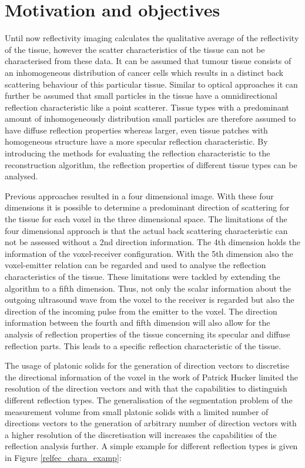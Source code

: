 \section{Motivation and objectives}
\label{chap:motivation}


Until now reflectivity imaging calculates the qualitative average of the reflectivity of the tissue, however the scatter characteristics of the tissue can not be characterised from these data. It can be assumed that tumour tissue consists of an inhomogeneous distribution of cancer cells which results in a distinct back scattering behaviour of this particular tissue. Similar to optical approaches it can further be assumed that small particles in the tissue have a omnidirectional reflection characteristic like a point scatterer. Tissue types with a predominant amount of inhomogeneously distribution small particles are therefore assumed to have diffuse reflection properties whereas larger, even tissue patches with homogeneous structure have a more specular reflection characteristic.
By introducing the methods for evaluating the reflection characteristic to the reconstruction algorithm, the reflection properties of different tissue types can be analysed.

Previous approaches resulted in a four dimensional image. With these four dimensions it is possible to determine a predominant direction of scattering for the tissue for each voxel in the three dimensional space. The limitations of the four dimensional approach is that the actual back scattering characteristic can not be assessed without a 2nd direction information. The 4th dimension holds the information of the voxel-receiver configuration. With the 5th dimension also the voxel-emitter relation can be regarded and used to analyse the reflection characteristics of the tissue. These limitations were tackled by extending the algorithm to a fifth dimension. Thus, not only the scalar information about the outgoing ultrasound wave from the voxel to the receiver is regarded but also the direction of the incoming pulse from the emitter to the voxel. The direction information between the fourth and fifth dimension will also allow for the analysis of reflection properties of the tissue concerning its specular and diffuse reflection parts. This leads to a specific reflection characteristic of the tissue.

The usage of platonic solids for the generation of direction vectors to discretise the directional information of the voxel in the work of Patrick Hucker \cite{PatrickHucker2014EvaluationRuckstreumodells} limited the resolution of the direction vectors and with that the capabilities to distinguish different reflection types. The generalisation of the segmentation problem of the measurement volume from small platonic solids with a limited number of directions vectors to the generation of arbitrary number of direction vectors with a higher resolution of the discretisation will increases the capabilities of the reflection analysis further. A simple example for different reflection types is given in Figure
\ref{relfec_chara_examp}:

